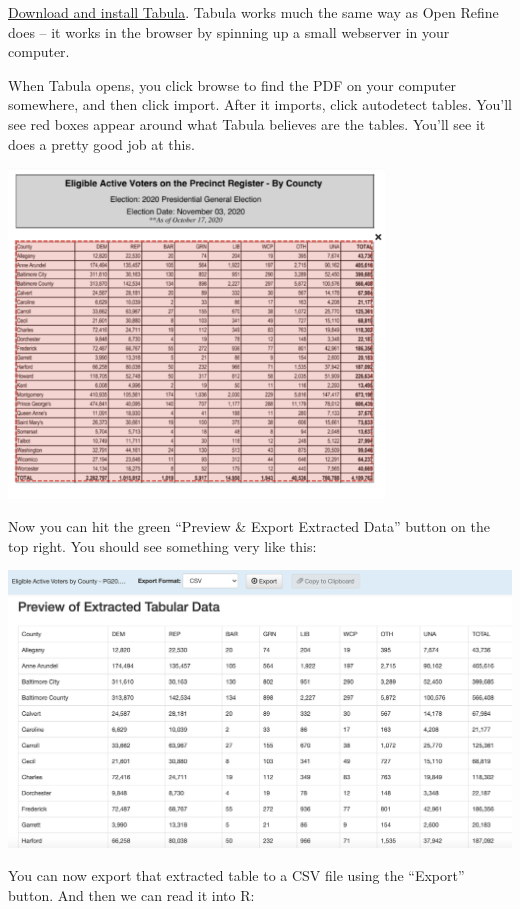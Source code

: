 \documentclass[
  letterpaper,
  DIV=11,
  numbers=noendperiod]{scrreprt}
\begin{document}
\href{https://tabula.technology/}{Download and install Tabula}. Tabula
works much the same way as Open Refine does -- it works in the browser
by spinning up a small webserver in your computer.

When Tabula opens, you click browse to find the PDF on your computer
somewhere, and then click import. After it imports, click autodetect
tables. You'll see red boxes appear around what Tabula believes are the
tables. You'll see it does a pretty good job at this.

\includegraphics[width=3.93in,height=\textheight]{./images/md_voters.png}

Now you can hit the green ``Preview \& Export Extracted Data'' button on
the top right. You should see something very like this:

\includegraphics[width=7.83in,height=\textheight]{./images/md_voters2.png}

You can now export that extracted table to a CSV file using the
``Export'' button. And then we can read it into R:
\end{document}

